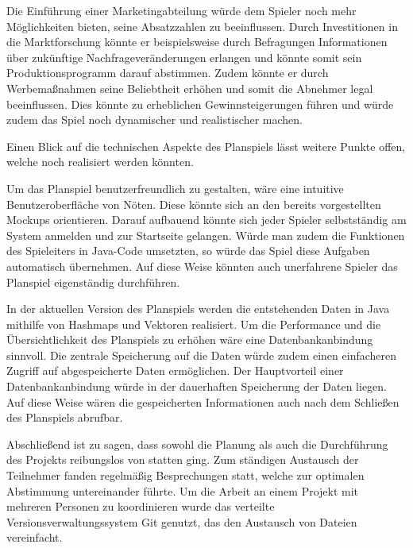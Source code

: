Die Einführung einer Marketingabteilung würde dem Spieler noch mehr Möglichkeiten bieten, seine Absatzzahlen zu beeinflussen. Durch Investitionen in die Marktforschung könnte er beispielsweise durch Befragungen Informationen über zukünftige Nachfrageveränderungen erlangen und könnte somit sein Produktionsprogramm darauf abstimmen. Zudem könnte er durch Werbemaßnahmen seine Beliebtheit erhöhen und somit die Abnehmer legal beeinflussen. Dies könnte zu erheblichen Gewinnsteigerungen führen und würde zudem das Spiel noch dynamischer und realistischer machen.

Einen Blick auf die technischen Aspekte des Planspiels lässt weitere Punkte offen, welche noch realisiert werden könnten.

Um das Planspiel benutzerfreundlich zu gestalten, wäre eine intuitive Benutzeroberfläche von Nöten. Diese könnte sich
an den bereits vorgestellten Mockups orientieren. Darauf aufbauend könnte sich jeder Spieler selbstständig am System
anmelden und zur Startseite gelangen. Würde man zudem die Funktionen des Spieleiters in Java-Code umsetzten, so würde
das Spiel diese Aufgaben automatisch übernehmen. Auf diese Weise könnten auch unerfahrene Spieler das Planspiel eigenständig
durchführen.

In der aktuellen Version des Planspiels werden die entstehenden Daten in Java mithilfe von Hashmaps und Vektoren realisiert.
Um die Performance und die Übersichtlichkeit des Planspiels zu erhöhen wäre eine Datenbankanbindung sinnvoll. Die zentrale
Speicherung auf die Daten würde zudem einen einfacheren Zugriff auf abgespeicherte Daten ermöglichen. Der Hauptvorteil
einer Datenbankanbindung würde in der dauerhaften Speicherung der Daten liegen. Auf diese Weise wären die gespeicherten
Informationen auch nach dem Schließen des Planspiels abrufbar.

Abschließend ist zu sagen, dass sowohl die Planung als auch die Durchführung des Projekts reibungslos von statten ging.
Zum ständigen Austausch der Teilnehmer fanden regelmäßig Besprechungen statt, welche zur optimalen Abstimmung untereinander
führte. Um die Arbeit an einem Projekt mit mehreren Personen zu koordinieren wurde das verteilte Versionsverwaltungssystem
Git genutzt, das den Austausch von Dateien vereinfacht.

\autorende{}
